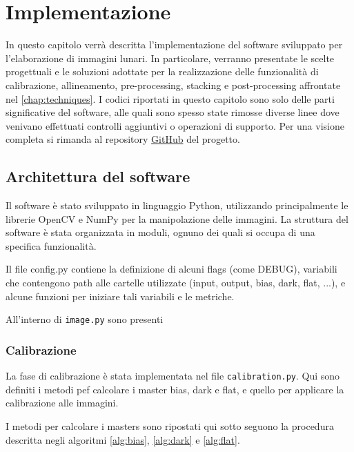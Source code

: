 \chapter{Implementazione} \label{chap:implementation}

In questo capitolo verrà descritta l'implementazione del software sviluppato per l'elaborazione di immagini lunari. In particolare, verranno presentate le scelte progettuali e le soluzioni adottate per la realizzazione delle funzionalità di calibrazione, allineamento, pre-processing, stacking e post-processing affrontate nel \cref{chap:techniques}. I codici riportati in questo capitolo sono solo delle parti significative del software, alle quali sono spesso state rimosse diverse linee dove venivano effettuati controlli aggiuntivi o operazioni di supporto. Per una visione completa si rimanda al repository \href{https://github.com/Spina02/Moon-Stacker.git}{GitHub} del progetto.

\section{Architettura del software} \label{sec:architecture}

Il software è stato sviluppato in linguaggio Python, utilizzando principalmente le librerie OpenCV e NumPy per la manipolazione delle immagini. La struttura del software è stata organizzata in moduli, ognuno dei quali si occupa di una specifica funzionalità.

Il file config.py contiene la definizione di alcuni flags (come DEBUG), variabili che contengono path alle cartelle utilizzate (input, output, bias, dark, flat, ...), e alcune funzioni per iniziare tali variabili e le metriche.

All'interno di \texttt{image.py} sono presenti 

\subsection{Calibrazione} \label{subsec:calibration_impl}

La fase di calibrazione è stata implementata nel file \texttt{calibration.py}. Qui sono definiti i metodi pef calcolare i master bias, dark e flat, e quello per applicare la calibrazione alle immagini.

I metodi per calcolare i masters sono ripostati qui sotto seguono la procedura descritta negli algoritmi \ref{alg:bias}, \ref{alg:dark} e \ref{alg:flat}.

